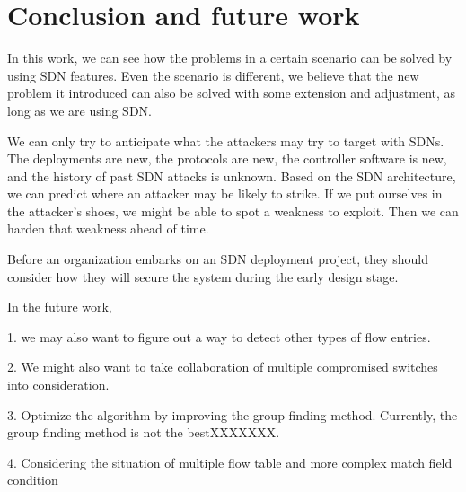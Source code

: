 \chapter{Conclusion and future work}
\label{conclusion}
In this work, we can see how the problems in a certain scenario can be solved by using SDN features. Even the scenario is different, we believe that the new problem it introduced can also be solved with some extension and adjustment, as long as we are using SDN.


We can only try to anticipate what the attackers may try to target with SDNs.  The deployments are new, the protocols are new, the controller software is new, and the history of past SDN attacks is unknown.  Based on the SDN architecture, we can predict where an attacker may be likely to strike.  If we put ourselves in the attacker’s shoes, we might be able to spot a weakness to exploit. Then we can harden that weakness ahead of time.

Before an organization embarks on an SDN deployment project, they should consider how they will secure the system during the early design stage. 

In the future work, 

1. we may also want to figure out a way to detect other types of flow entries.

2. We might also want to take collaboration of multiple compromised switches into consideration.

3. Optimize the algorithm by improving the group finding method. Currently, the group finding method is not the bestXXXXXXX.

4. Considering the situation of multiple flow table and more complex match field condition